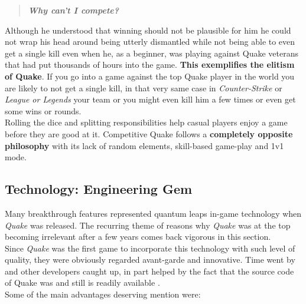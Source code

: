 \begin{quote}
\begin{center}
\textit{\textbf{Why can't I compete?}}
\end{center}
\end{quote}

Although he understood that winning should not be plausible for him he could not wrap his head around being utterly dismantled while not being able to even get a single kill even when he, as a beginner, was playing against Quake veterans that had put thousands of hours into the game. \textbf{This exemplifies the elitism of Quake}. If you go into a game against the top Quake player in the world you are likely to not get a single kill, in that very same case in \textit{Counter-Strike} or \textit{League or Legends} your team or you might even kill him a few times or even get some wins or rounds.\\

Rolling the dice and splitting responsibilities help casual players enjoy a game before they are good at it. Competitive Quake follows a \textbf{completely opposite philosophy} with its lack of random elements, skill-based game-play and 1v1 mode.\\ 


\subsection{Technology: Engineering Gem}

Many breakthrough features represented quantum leaps in-game technology when \textit{Quake} was released. The recurring theme of reasons why \textit{Quake} was at the top becoming irrelevant after a few years comes back vigorous in this section.\\

Since \textit{Quake} was the first game to incorporate this technology with such level of quality, they were obviously regarded avant-garde and innovative. Time went by and other developers caught up, in part helped by the fact that the source code of Quake was and still is readily available \citep{git:id}.\\

Some of the main advantages deserving mention were:

